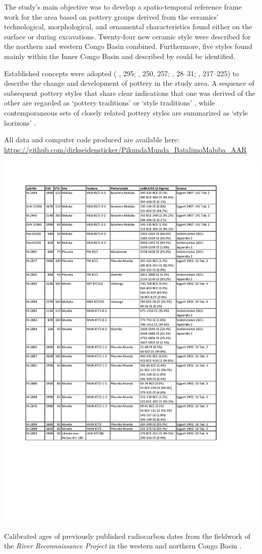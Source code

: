 \documentclass[smallextended,natbib]{svjour3}       %
\begin{document}
The study's main objective was to develop a spatio-temporal reference frame work for the area based on pottery groups derived from the ceramics' technological, morphological, and ornamental characteristics found either on the surface or during excavations. Twenty-four new ceramic style were described for the northern and western Congo Basin combined. Furthermore, five styles found mainly within the Inner Congo Basin and described by \citet{Wotzka.1995} could be identified.

Established concepts were adopted (\citeauthor{Eggert.1983} \citeyear{Eggert.1983}, 295; \citeyear{Eggert.1984}, 250, 257; \citeyear{Eggert.1988}, 28--31; \citeauthor{Wotzka.1995} \citeyear{Wotzka.1995}, 217--225) to describe the change and development of pottery in the study area. A sequence of subsequent pottery styles that share clear indications that one was derived of the other are regarded as ‘pottery traditions’ or ‘style traditions’ \citep{Rouse.1957,Willey.1945}, while contemporaneous sets of closely related pottery styles are summarized as ‘style horizons’ \citep[108--111]{Kroeber.1944}.

All data and computer code produced are available here: \url{https://github.com/dirkseidensticker/PikundaMunda_BatalimoMaluba_AAR}

\begin{table}[p]
	\centering
	\includegraphics[width=.9\textwidth]{Tab_Old14C.pdf}
	\caption{Calibrated ages \citep{Reimer.2020} of previously published radiocarbon dates from the fieldwork of the \textit{River Reconnaissance Project} in the western and northern Congo Basin \citep[Appendix 2]{Seidensticker.2021e}.}
	\label{tab:14Cold}	
\end{table}
\end{document}
